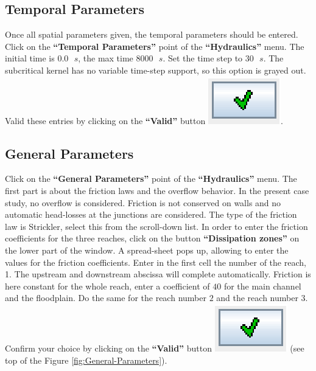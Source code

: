 \documentclass[a4paper,12pt]{article}
\begin{document}
\subsection{Temporal Parameters }

\hspace{0.5cm}Once all spatial parameters given, the temporal parameters should
be entered. Click on the \textbf{{}``Temporal Parameters''} point
of the \textbf{{}``Hydraulics''} menu. The initial time is $0.0\mbox{ }s$,
the max time $8000\mbox{ }s$. Set the time step to $30\mbox{ }s$. The subcritical kernel
has no variable time-step support, so this option is grayed out. Valid
these entries by clicking on the \textbf{{}``Valid'' }button \includegraphics[scale=0.6]{valid}.


\subsection{General Parameters }

\hspace{0.5cm}Click on the \textbf{{}``General Parameters''} point of the \textbf{{}``Hydraulics''}
menu. The first part is about the friction laws and the overflow behavior.
In the present case study, no overflow is considered. Friction is
not conserved on walls and no automatic head-losses at the junctions
are considered. The type of the friction law is Strickler, select
this from the scroll-down list. In order to enter the friction coefficients
for the three reaches, click on the button \textbf{{}``Dissipation
zones''} on the lower part of the window. A spread-sheet pops up,
allowing to enter the values for the friction coefficients. Enter
in the first cell the number of the reach, 1. The upstream and downstream
abscissa will complete automatically. Friction is here constant for
the whole reach, enter a coefficient of $40$ for the main channel and
the floodplain. Do the same for the reach number $2$ and the reach number
$3$. Confirm your choice by clicking on the \textbf{{}``Valid''} button
\includegraphics[scale=0.6]{valid}
(see top of the Figure \ref{fig:General-Parameters}).
\end{document}
